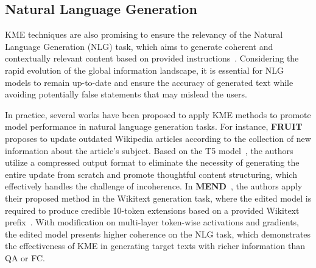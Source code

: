 \documentclass[acmsmall, screen]{acmart}
\begin{document}

\subsection{Natural Language Generation}
 KME techniques are also promising to ensure the relevancy of the Natural Language Generation (NLG) task, which aims to generate coherent and contextually relevant content based on provided instructions~\cite{reiter_dale_1997}. Considering the rapid evolution of the global information landscape, it is essential for NLG models to remain up-to-date and ensure the accuracy of generated text while avoiding potentially false statements that may mislead the users. %

 In practice, several works have been proposed to apply KME methods to promote model performance in natural language generation tasks. For instance, \textbf{FRUIT}~\cite{logan2022fruit} proposes to update outdated Wikipedia articles according to the collection of new information about the article’s subject. Based on the T5 model~\cite{raffel2020exploring}, the authors utilize a compressed output format to eliminate the necessity of generating the entire update from scratch and promote thoughtful content structuring, which effectively handles the challenge of incoherence. In \textbf{MEND}~\cite{mitchell2022fast}, the authors apply their proposed method in the Wikitext generation task, where the edited model is required to produce credible 10-token extensions based on a provided Wikitext prefix~\cite{ma2021ditilgpt2}. With modification on multi-layer token-wise activations and gradients, the edited model presents higher coherence on the NLG task, which demonstrates the effectiveness of KME in generating target texts with richer information than QA or FC. 
\end{document}
